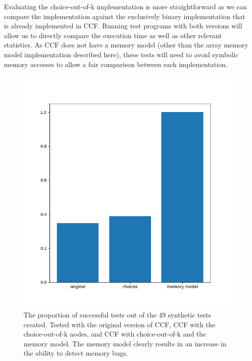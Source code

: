 \documentclass[12pt,twoside]{report}
\begin{document}
Evaluating the choice-out-of-k implementation is more straightforward as we can compare the implementation against the exclusively binary implementation that is already implemented in CCF. Running test programs with both versions will allow us to directly compare the execution time as well as other relevant statistics. As CCF does not have a memory model (other than the array memory model implementation described here), these tests will need to avoid symbolic memory accesses to allow a fair comparison between each implementation.

\begin{figure}
    \centering
    \includegraphics[scale=0.4]{successful_tests.png}
    \caption{The proportion of successful tests out of the 49 synthetic tests created. Tested with the original version of CCF, CCF with the choice-out-of-k nodes, and CCF with choice-out-of-k and the memory model. The memory model clearly results in an increase in the ability to detect memory bugs.}
    \label{fig:successful-tests}
\end{figure}
\end{document}
